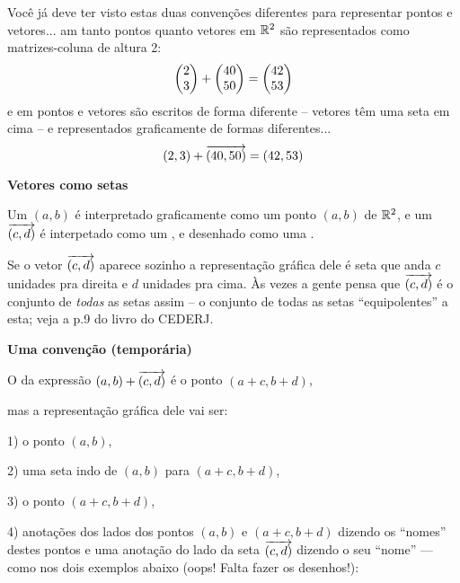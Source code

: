 \documentclass[oneside,12pt]{article}
\begin{document}

Você já deve ter visto estas duas convenções diferentes para
representar pontos e vetores... am  tanto
pontos quanto vetores em $\mathbb{R}^2$ são representados como matrizes-coluna
de altura 2:
%
$$\left (\begin{matrix}2\\3\end{matrix}\right ) + \left (\begin{matrix}40\\50\end{matrix}\right ) = \left (\begin{matrix}42\\53\end{matrix}\right )$$
%
e em  pontos e vetores são escritos de
forma diferente -- vetores têm uma seta em cima -- e representados
graficamente de formas diferentes...
%
$$(2,3) + {\overrightarrow{(40,50)}} = (42,53)$$
%


\newpage


{\bf Vetores como setas}

Um  $(a,b)$ é interpretado graficamente como um ponto
$(a,b)$ de $\mathbb{R}^2$, e um  ${\overrightarrow{(c,d)}}$ é interpetado
como um , e desenhado como uma .

Se o vetor ${\overrightarrow{(c,d)}}$ aparece sozinho a representação gráfica dele é
 seta que anda $c$ unidades pra direita e $d$
unidades pra cima. Às vezes a gente pensa que ${\overrightarrow{(c,d)}}$ é o conjunto
de {\sl todas} as setas assim -- o conjunto de todas as setas
``equipolentes'' a esta; veja a p.9 do livro do CEDERJ.

\newpage


{\bf Uma convenção (temporária)}

O  da expressão $(a,b)+{\overrightarrow{(c,d)}}$ é o ponto
$(a+c,b+d)$,

mas a representação gráfica dele vai ser:

1) o ponto $(a,b)$,

2) uma seta indo de $(a,b)$ para $(a+c,b+d)$,

3) o ponto $(a+c,b+d)$,

4) anotações dos lados dos pontos $(a,b)$ e $(a+c,b+d)$ dizendo os
``nomes'' destes pontos e uma anotação do lado da seta ${\overrightarrow{(c,d)}}$
dizendo o seu ``nome'' --- como nos dois exemplos abaixo (oops! Falta
fazer os desenhos!):
\end{document}
